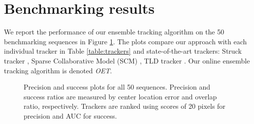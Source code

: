 \section{Benchmarking results}

We report the performance of our ensemble tracking algorithm on the 50
benchmarking sequences in
Figure \ref{fig:results}.
The plots compare our approach with each individual tracker
in Table \ref{table:trackers} and state-of-the-art trackers: Struck tracker
\cite{Hare2011}, Sparse Collaborative Model (SCM) \cite{Zhong2012}, TLD tracker
\cite{Kalal2011}. Our online ensemble tracking algorithm is denoted \textit{OET}.

\begin{figure}[h!]
\centering
{}
\caption{\small  Precision and success plots for all 50 sequences. Precision and success
		ratios are measured by center location error and overlap ratio,
		respectively. Trackers are ranked using scores of 20 pixels for
		precision and AUC for success.}
\label{fig:results}
\end{figure}

